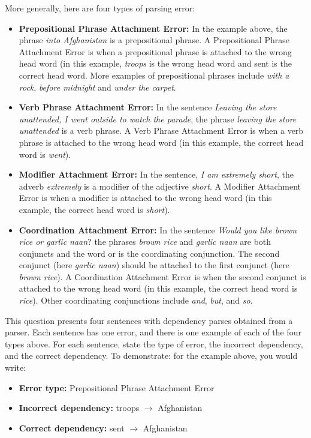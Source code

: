 \begin{enumerate}[1.]
More generally, here are four types of parsing error:

\begin{itemize}
\item {\bf Prepositional Phrase Attachment Error:} In the example above, the phrase {\em into Afghanistan} is a prepositional phrase. A Prepositional Phrase Attachment Error is when a prepositional phrase is attached to the wrong head word (in this example, {\em troops} is the wrong head word and sent is the correct head word. More examples of prepositional phrases include {\em with a rock}, {\em before midnight} and {\em under the carpet}. 

\item {\bf Verb Phrase Attachment Error:} In the sentence {\em Leaving the store unattended, I went outside to watch the parade}, the phrase {\em leaving the store unattended} is a verb phrase. A Verb Phrase Attachment Error is when a verb phrase is attached to the wrong head word (in this example, the correct head word is {\em went}).
   
\item {\bf Modifier Attachment Error:} In the sentence, {\em I am extremely short}, the adverb {\em extremely} is a modifier of the adjective {\em short}. A Modifier Attachment Error is when a modifier is attached to the wrong head word (in this example, the correct head word is {\em short}).
 
\item {\bf Coordination Attachment Error:} In the sentence {\em Would you like brown rice or garlic naan}? the phrases {\em brown rice} and {\em garlic naan} are both conjuncts and the word or is the coordinating conjunction. The second conjunct (here {\em garlic naan}) should be attached to the first conjunct (here {\em brown rice}). A Coordination Attachment Error is when the second conjunct is attached to the wrong head word (in this example, the correct head word is {\em rice}). Other coordinating conjunctions include {\em and}, {\em but}, and {\em so}.
\end{itemize}

This question presents four sentences with dependency parses obtained from a parser. Each sentence has one error, and there is one example of each of the four types above. For each sentence, state the type of error, the incorrect dependency, and the correct dependency. To demonstrate: for the example above, you would write: 

\begin{itemize}
\item {\bf Error type:} Prepositional Phrase Attachment Error 
\item {\bf Incorrect dependency:} troops $\rightarrow$ Afghanistan 
\item {\bf Correct dependency:} sent $\rightarrow$ Afghanistan
\end{itemize}


\end{enumerate}
